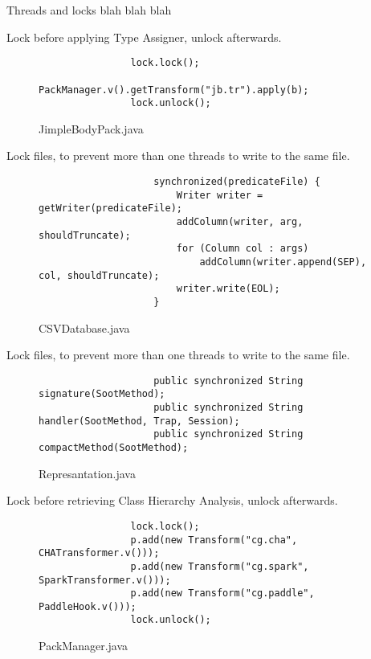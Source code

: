 \documentclass{dithesis}
\begin{document}
    Threads and locks blah blah blah

		Lock before applying Type Assigner, unlock afterwards.
    	\begin{figure}[H]
            \begin{lstlisting}
		    	lock.lock();
				PackManager.v().getTransform("jb.tr").apply(b);
				lock.unlock();
			\end{lstlisting}
        \caption{JimpleBodyPack.java}
        \end{figure}

	    	Lock files, to prevent more than one threads to write to the same file. 
	    	\begin{figure}[H]
	            \begin{lstlisting}
			    	synchronized(predicateFile) {
		                Writer writer = getWriter(predicateFile);
		                addColumn(writer, arg, shouldTruncate);
		                for (Column col : args)
		                    addColumn(writer.append(SEP), col, shouldTruncate);
		                writer.write(EOL);
	            	}
				\end{lstlisting}
	        \caption{CSVDatabase.java}
	        \end{figure}
	    	Lock files, to prevent more than one threads to write to the same file. 
	    	\begin{figure}[H]
	            \begin{lstlisting}
			    	public synchronized String signature(SootMethod);
			    	public synchronized String handler(SootMethod, Trap, Session);
			    	public synchronized String compactMethod(SootMethod);
				\end{lstlisting}
	        \caption{Represantation.java}
	        \end{figure}

    	Lock before retrieving Class Hierarchy Analysis, unlock afterwards.
		\begin{figure}[H]
            \begin{lstlisting}
				lock.lock();
				p.add(new Transform("cg.cha", CHATransformer.v()));
				p.add(new Transform("cg.spark", SparkTransformer.v()));
				p.add(new Transform("cg.paddle", PaddleHook.v()));
				lock.unlock();
			\end{lstlisting}
        \caption{PackManager.java}
        \end{figure}
\end{document}

